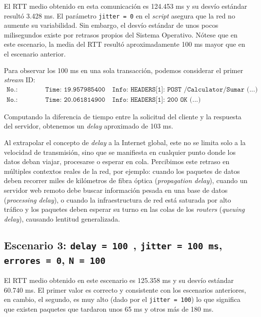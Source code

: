 \documentclass[a4paper,12pt]{article}
\begin{document}
El RTT medio obtenido en esta comunicación es 124.453 ms y su desvío estándar resultó 3.428 ms. El parámetro \texttt{jitter = 0} en el \textit{script} asegura que la red no aumente su variabilidad. Sin embargo, el desvío estándar de unos pocos milisegundos existe por retrasos propios del Sistema Operativo. Nótese que en este escenario, la media del RTT resultó aproximadamente 100 ms mayor que en el escenario anterior.

Para observar los 100 ms en una sola transacción, podemos considerar el primer \textit{stream} ID:
\begin{align*}
\texttt{No.: 1964} &\quad \texttt{Time: 19.957985400} \quad \texttt{Info: HEADERS[1]: POST /Calculator/Sumar (...)} \\
\texttt{No.: 2138} &\quad \texttt{Time: 20.061814900} \quad \texttt{{Info: HEADERS[1]: 200 OK (...)}}
\end{align*}

Computando la diferencia de tiempo entre la solicitud del cliente y la respuesta del servidor, obtenemos un \textit{delay} aproximado de 103 ms.


Al extrapolar el concepto de \textit{delay} a la Internet global, este no se limita solo a la velocidad de transmisión, sino que se manifiesta en cualquier punto donde los datos deban viajar, procesarse o esperar en cola. Percibimos este retraso en múltiples contextos reales de la red, por ejemplo: cuando los paquetes de datos deben recorrer miles de kilómetros de fibra óptica (\textit{propagation delay}), cuando un servidor web remoto debe buscar información pesada en una base de datos (\textit{processing delay}), o cuando la infraestructura de red está saturada por alto tráfico y los paquetes deben esperar su turno en las colas de los \textit{routers} (\textit{queuing delay}), causando lentitud generalizada.

\subsection{Escenario 3: \texttt{delay = 100 }, \texttt{jitter = 100 ms}, \texttt{errores = 0}, \texttt{N = 100} }

El RTT medio obtenido en este escenario es 125.358 ms y su desvío estándar 60.740 ms. El primer valor es correcto y consistente con los escenarios anteriores, en cambio, el segundo, es muy alto (dado por el \texttt{jitter = 100}) lo que significa que existen paquetes que tardaron unos 65 ms y otros más de 180 ms.
\end{document}
